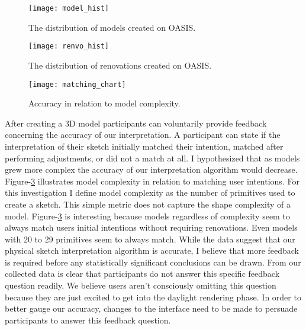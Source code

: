  
\begin{figure}[!ht]
\centering
\texttt{[image: model\_hist]}
\caption{The distribution of models created on OASIS.}
\label{fig:model_hist}
\end{figure}


\begin{figure}[!ht]
\centering
\texttt{[image: renvo\_hist]}
\caption{The distribution of renovations created on OASIS.}
\label{fig:renvo_hist}
\end{figure}


\begin{figure}[!ht]
\centering
\texttt{[image: matching\_chart]}
\caption{Accuracy in relation to model complexity.}
\label{fig:matching_chart}
\end{figure}

After creating a 3D model participants can voluntarily provide feedback concerning the accuracy of our interpretation.  A participant can state if the  interpretation of their sketch initially matched their intention,  matched after performing adjustments, or did not a match at all.  I hypothesized that as models grew more complex the accuracy of our interpretation algorithm would decrease.  Figure-\ref{fig:matching_chart} illustrates model complexity in relation to matching user intentions.  For this investigation I define model complexity as the number of primitives used to create a sketch. This simple metric does not capture the shape complexity of a model.  Figure-\ref{fig:matching_chart} is interesting because models regardless of complexity seem to always match users initial intentions without requiring renovations.  Even models with 20 to 29 primitives seem to always match.  While the data suggest that our physical sketch interpretation algorithm is accurate, I believe that more feedback is required before any statistically significant conclusions can be drawn.  From our collected data is clear that participants do not answer this specific feedback question readily.  We believe users aren't consciously omitting this question because they are just excited to get into the daylight rendering phase.  In order to better gauge our accuracy, changes to the interface need to be made to persuade participants to answer this feedback question. \\ 

